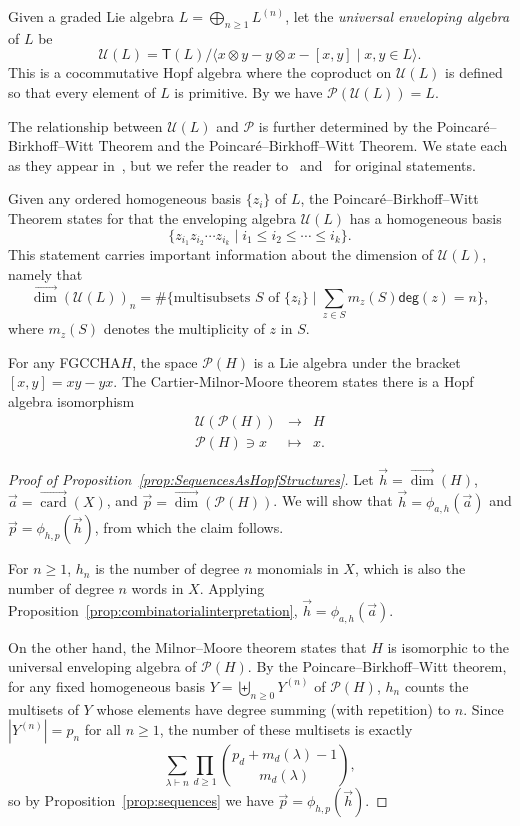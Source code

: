 \documentclass[11pt]{amsart}
\theoremstyle{definition}
\numberwithin{equation}{section}
\newcommand{\FGCCHA}{\textsf{FGCCHA}\xspace}
\newcommand{\vecdim}{\overrightarrow{\dim}}
\newcommand{\veccard}{\overrightarrow{\operatorname{card}}}
\begin{document}
Given a graded Lie algebra $L = \bigoplus_{n \ge 1} L^{(n)}$, let the \emph{universal enveloping algebra} of $L$ be
\[
\mathcal{U}(L) = \mathsf{T}(L) \big/ \big\langle x\otimes y - y \otimes x - [x, y] \;|\; \text{$x, y \in L$} \big\rangle.
\]
This is a cocommutative Hopf algebra where the coproduct on $\mathcal{U}(L)$ is defined so that every element of $L$ is primitive.  By \cite[Theorem 1.4]{Reutenauer-FreeLieAlgebras} we have $\mathcal{P}(\mathcal{U}(L))=L$.  

The relationship between $\mathcal{U}(L)$ and $\mathcal{P}$ is further determined by the Poincar\'{e}--Birkhoff--Witt Theorem and the Poincar\'{e}--Birkhoff--Witt Theorem.  We state each as they appear in~\cite[Theorem 4.1.3]{L08}, but we refer the reader to~\cite[{\color{red} missing ref!}]{Cartier57} and~\cite[Theorem 5.18]{MM65} for original statements.

Given any ordered homogeneous basis $\{z_i\}$ of $L$, the Poincar\'{e}--Birkhoff--Witt Theorem
states for that the enveloping algebra $\mathcal{U}(L)$ has a homogeneous basis
\[
\{ z_{i_1}z_{i_2}\cdots z_{i_k} \;|\; i_1 \leq i_2 \leq \cdots \leq i_k\}.
\]
This statement carries important information about the dimension of $\mathcal{U}(L)$, namely that 
\[
\vecdim(\mathcal{U}(L))_{n}= \#\{\text{multisubsets $S$ of $\{z_{i}\}$} \;|\; \sum_{z \in S} m_{z}(S) \mathsf{deg}(z) = n\},
\]
where $m_{z}(S)$ denotes the multiplicity of $z$ in $S$.

For any \FGCCHA $H$, the space $\mathcal{P}(H)$ is a Lie algebra under the bracket $[x, y] = xy - yx$.  
The Cartier-Milnor-Moore theorem states there is a Hopf algebra isomorphism
\[
\begin{array}{rcl}
\mathcal{U}(\mathcal{P}(H)) &\to& H \\
\mathcal{P}(H) \ni x & \mapsto&  x.
\end{array}
\]

\begin{proof}[Proof of Proposition~\ref{prop:SequencesAsHopfStructures}]
Let $\vec{h} = \vecdim(H)$, $\vec{a} = \veccard(X)$, and $\vec{p} = \vecdim(\mathcal{P}(H))$.  We will show that $\vec{h} = \phi_{a, h}(\vec{a})$ and $\vec{p} = \phi_{h, p}(\vec{h})$, from which the claim follows.  

For $n \ge 1$, $h_{n}$ is the number of degree $n$ monomials in $X$, which is also the number of degree $n$ words in $X$.  
Applying Proposition~\ref{prop:combinatorialinterpretation}, $\vec{h} = \phi_{a, h}(\vec{a})$.

On the other hand, the Milnor--Moore theorem states that $H$ is
isomorphic to the universal enveloping algebra of $\mathcal{P}(H)$.
By the Poincare--Birkhoff--Witt theorem, for any fixed homogeneous basis
$Y = \biguplus_{n \ge 0} Y^{(n)}$ of $\mathcal{P}(H)$, $h_{n}$ counts
the multisets of $Y$ whose elements have degree summing (with repetition)
to $n$.  Since $|Y^{(n)}| = p_{n}$ for all $n \ge 1$, the number of these
multisets is exactly
\[
\sum_{\lambda \vdash n} \prod_{d \geq 1} \binom{p_d + m_d(\lambda) -1}{m_d(\lambda)},
\]
so by Proposition~\ref{prop:sequences} we have $\vec{p} = \phi_{h, p}(\vec{h})$.
\end{proof}
\end{document}
